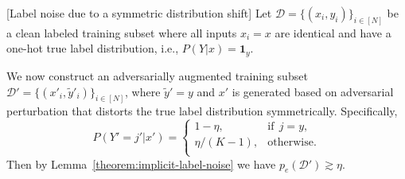 \begin{example}
[Label noise due to a symmetric distribution shift]
\label{example:label-noise-influence}
Let $\mathcal{D}=\{(x_i, y_i)\}_{i\in[N]}$ be a clean labeled training subset where all inputs $x_i=x$ are identical and have a one-hot true label distribution, i.e., $P(Y|x) = \mathbf{1}_y$. %

We now construct an adversarially augmented training subset $\mathcal{D'} = \{(x'_i, \tilde{y}'_i)\}_{i\in[N]}$, where $\tilde{y}' = y$ and $x'$ is generated based on adversarial perturbation that distorts the true label distribution symmetrically. Specifically,
$$
P(Y'= j' | x') =
\begin{cases} 
1 - \eta, & \text{if}~~j = y, \\
\eta/(K-1), & \text{otherwise}. \\
\end{cases}
$$
Then by Lemma~\ref{theorem:implicit-label-noise} 
we have $p_e (\mathcal{D}')\gtrsim \eta$.
\end{example}
   

